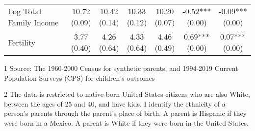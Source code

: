 \begin{table}[H]
{\begin{threeparttable}
\begin{tabular}[t]{>{\raggedright\arraybackslash}p{5cm}cccccc}
Log Total Family Income & \specialcell{10.72\\(0.09)} & \specialcell{10.42\\(0.14)} & \specialcell{10.33\\(0.12)} & \specialcell{10.20\\(0.07)} & \specialcell{-0.52***\\(0.00)} & \specialcell{-0.09***\\(0.00)}\\
Fertility & \specialcell{3.77\\(0.40)} & \specialcell{4.26\\(0.64)} & \specialcell{4.33\\(0.64)} & \specialcell{4.46\\(0.49)} & \specialcell{0.69***\\(0.00)} & \specialcell{0.07***\\(0.00)}\\
\bottomrule
\end{tabular}
\begin{tablenotes}
\item[1] Source: The 1960-2000 Census for synthetic parents, and 1994-2019 Current Population Surveys (CPS) for children's outcomes
\item[2] The data is restricted to native-born United States citizens who are also White, between the ages of 25 and 40, and have kids. I identify the ethnicity of a person's parents through the parent's place of birth. A parent is Hispanic if they were born in a Mexico. A parent is White if they were born in the United States.
\end{tablenotes}
\end{threeparttable}}
\end{table}
